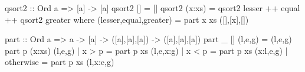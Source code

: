 \documentclass{article}
\begin{document}
\noindent\small
\begin{pygmented}[lang=hs]
qsort2 :: Ord a => [a] -> [a]
qsort2 []     = []
qsort2 (x:xs) = qsort2 lesser ++ equal ++ qsort2 greater
    where
        (lesser,equal,greater) = part x xs ([],[x],[])

part :: Ord a => a -> [a] -> ([a],[a],[a]) -> ([a],[a],[a])
part _ [] (l,e,g) = (l,e,g)
part p (x:xs) (l,e,g)
    | x > p     = part p xs (l,e,x:g)
    | x < p     = part p xs (x:l,e,g)
    | otherwise = part p xs (l,x:e,g)
\end{pygmented}
\end{document}
